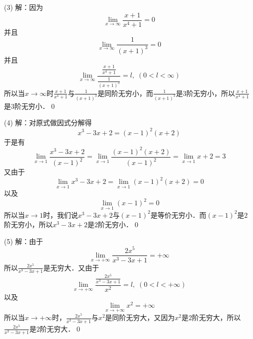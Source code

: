 \medskip
(3) 解：因为
\begin{equation}
    \lim_{x \to \infty} \frac{x+1}{x^4+1} = 0
\end{equation}
并且
\begin{equation}
    \lim_{x \to \infty} \frac{1}{\left( x+1 \right)^3} = 0
\end{equation}
并且
\begin{equation}
    \lim_{x \to \infty} \displaystyle\frac{\displaystyle\frac{x+1}{x^4+1}}{\displaystyle\frac{1}{\left(x+1\right)^3}} = l, \; (0 < l < \infty)
\end{equation}
所以当$x \to \infty$时$\displaystyle\frac{x+1}{x^4+1}$与$\displaystyle\frac{1}{\left(x+1\right)^3}$是同阶无穷小，而$\displaystyle\frac{1}{(x+1)^3}$是$3$阶无穷小，所以$\displaystyle\frac{x+1}{x^4+1}$是$3$阶无穷小．\qed

\medskip
(4) 解：对原式做因式分解得
\begin{equation}
    x^3 - 3x + 2 = (x-1)^2 (x+2)
\end{equation}
于是有
\begin{equation}
    \lim_{x \to 1} \frac{x^3-3x+2}{(x-1)^2} = \lim_{x \to 1} \frac{(x-1)^2(x+2)}{(x-1)^2} = \lim_{x \to 1} x+2 = 3
\end{equation}
又由于
\begin{equation}
    \lim_{x \to 1} x^3 - 3x + 2 = \lim_{x \to 1} (x-1)^2 (x+2) = 0
\end{equation}
以及
\begin{equation}
    \lim_{x \to 1} (x-1)^2 = 0
\end{equation}
所以当$x \to 1$时，我们说$x^3-3x+2$与$(x-1)^2$是等价无穷小．而$(x-1)^2$是$2$阶无穷小，所以$x^3-3x+2$是$2$阶无穷小．\qed

\medskip
(5) 解：由于
\begin{equation}
    \lim_{x \to +\infty} \frac{2x^5}{x^3-3x+1} = +\infty
\end{equation}
所以$\displaystyle\frac{2x^5}{x^3-3x+1}$是无穷大．又由于
\begin{equation}
    \lim_{x \to +\infty} \displaystyle\frac{\displaystyle\frac{2x^5}{x^3-3x+1}}{x^2} = l, \; (0 < l < +\infty)
\end{equation}
以及
\begin{equation}
    \lim_{x \to +\infty} x^2 = +\infty
\end{equation}
所以当$x \to +\infty$时，$\displaystyle\frac{2x^5}{x^3-3x+1}$与$x^2$是同阶无穷大，又因为$x^2$是$2$阶无穷大，所以$\displaystyle\frac{2x^5}{x^3-3x+1}$是$2$阶无穷大．\qed

